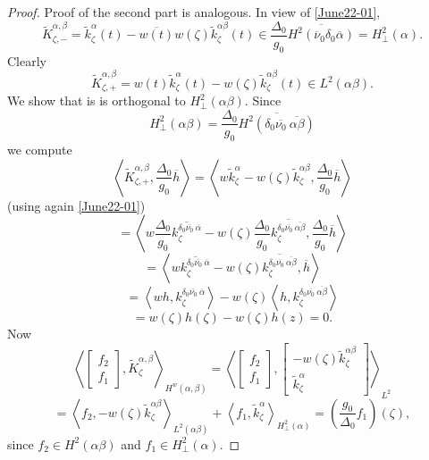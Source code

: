 \documentclass[reqno,11pt,centertags]{article}
\newcommand{\z}{\zeta}
\theoremstyle{definition}
\def\a{\alpha}
\def\b{\beta}
\def\d{\delta}
\def\D{\Delta}
\def\z{\zeta}
\begin{document}
\begin{proof}
Proof of the second part is analogous. In view of \eqref{June22-01},
$$
\widetilde
K_{\zeta,-}^{\alpha, \beta}
=
\widetilde k^\alpha_\zeta(t)
-\overline{w(t)}w(\zeta)\widetilde k^{\alpha\beta}_\zeta(t)
\in
\frac{\D_0}{g_0}\overline{H^2(\overline\nu_0\d_0\overline\alpha)}
=
H^2_\perp(\alpha).
$$
Clearly
$$
\widetilde K_{\zeta,+}^{\alpha, \beta}
=
w(t)\widetilde k^\alpha_\zeta(t)
- w(\zeta)\widetilde k^{\alpha\beta}_\zeta(t)\in L^2(\a\b).
$$
We show that is is orthogonal to $H^2_\perp(\a\b)$.
Since
$$
H^2_\perp(\a\b)=\dfrac{\D_0}{g_0}\overline {H^2(\delta_0 \overline{\nu_0}\ \overline{\alpha\b})}
$$
we compute
$$
\left\langle\widetilde K_{\zeta,+}^{\alpha, \beta}, \dfrac{\D_0}{g_0}\overline h\right\rangle
=\left\langle
w \widetilde k^\alpha_\zeta
- w(\zeta)\widetilde k^{\alpha\beta}_\zeta, \dfrac{\D_0}{g_0}\overline h\right\rangle
$$
(using again \eqref{June22-01})
$$
=\left\langle
w \dfrac{\Delta_0}{g_0}\overline{k^{\delta_0 \overline{\nu_0}\ \overline\alpha}_\zeta}
- w(\zeta)\dfrac{\Delta_0}{g_0}\overline{k^{\delta_0 \overline{\nu_0}\ \overline{\alpha\b}}_\zeta}, \dfrac{\D_0}{g_0}\overline h\right\rangle
$$
$$
=\left\langle
w \overline{k^{\delta_0 \overline{\nu_0}\ \overline\alpha}_\zeta}
- w(\zeta)\overline{k^{\delta_0 \overline{\nu_0}\ \overline{\alpha\b}}_\zeta}, \overline h\right\rangle
$$
$$
=\left\langle
w h, {k^{\delta_0 \overline{\nu_0}\ \overline\alpha}_\zeta}
\right\rangle
-
w(\zeta)
\left\langle h, {k^{\delta_0 \overline{\nu_0}\ \overline{\alpha\b}}_\zeta}\right\rangle
$$
$$
=w(\z)h(\z)-w(\z)h(z)=0.
$$
Now
$$
\left\langle\begin{bmatrix} f_2 \\ f_1 \end{bmatrix}, \widetilde K_{\zeta}^{\alpha, \beta}\right\rangle_{H^w(\alpha, \beta)}
=
\left\langle\begin{bmatrix} f_2 \\ f_1 \end{bmatrix},
\begin{bmatrix} -w(\zeta)\widetilde k^{\alpha\beta}_\zeta \\
\widetilde k^\alpha_\zeta \end{bmatrix}
\right\rangle_{L^2}
$$
$$
=
\left\langle f_2 , -w(\zeta)\widetilde k^{\alpha\beta}_\zeta\right\rangle_{L^2(\alpha\beta)}
+
\left\langle f_1 , \widetilde k^\alpha_\zeta \right\rangle_{H^2_\perp (\alpha)}
=\left(\frac{g_0}{\D_0}f_1\right)(\zeta),
$$
since $f_2\in H^2(\alpha\beta)$ and $f_1\in H^2_\perp(\alpha)$.
\end{proof}
\end{document}
